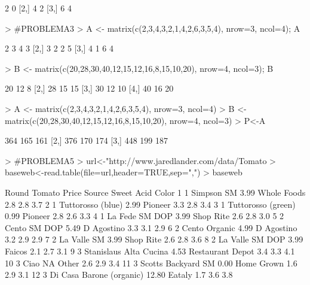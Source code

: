 \documentclass{article}
\begin{document}
\begin{Schunk}
\begin{Soutput}
     [,1] [,2]
[1,]    2    0
[2,]    4    2
[3,]    6    4
\end{Soutput}
\begin{Sinput}
> #PROBLEMA3
> A <- matrix(c(2,3,4,3,2,1,4,2,6,3,5,4), nrow=3, ncol=4); A
\end{Sinput}
\begin{Soutput}
     [,1] [,2] [,3] [,4]
[1,]    2    3    4    3
[2,]    3    2    2    5
[3,]    4    1    6    4
\end{Soutput}
\begin{Sinput}
> B <- matrix(c(20,28,30,40,12,15,12,16,8,15,10,20), nrow=4, ncol=3); B
\end{Sinput}
\begin{Soutput}
     [,1] [,2] [,3]
[1,]   20   12    8
[2,]   28   15   15
[3,]   30   12   10
[4,]   40   16   20
\end{Soutput}
\begin{Sinput}
> A <- matrix(c(2,3,4,3,2,1,4,2,6,3,5,4), nrow=3, ncol=4)
> B <- matrix(c(20,28,30,40,12,15,12,16,8,15,10,20), nrow=4, ncol=3)
>              P<-A %*%B;P
\end{Sinput}
\begin{Soutput}
     [,1] [,2] [,3]
[1,]  364  165  161
[2,]  376  170  174
[3,]  448  199  187
\end{Soutput}
\begin{Sinput}
> #PROBLEMA5
>              url<-"http://www.jaredlander.com/data/Tomato%20First.csv"
> baseweb<-read.table(file=url,header=TRUE,sep=",")
> baseweb
\end{Sinput}
\begin{Soutput}
   Round                   Tomato Price           Source Sweet Acid Color
1      1               Simpson SM  3.99      Whole Foods   2.8  2.8   3.7
2      1        Tuttorosso (blue)  2.99          Pioneer   3.3  2.8   3.4
3      1       Tuttorosso (green)  0.99          Pioneer   2.8  2.6   3.3
4      1           La Fede SM DOP  3.99        Shop Rite   2.6  2.8   3.0
5      2             Cento SM DOP  5.49       D Agostino   3.3  3.1   2.9
6      2            Cento Organic  4.99       D Agostino   3.2  2.9   2.9
7      2              La Valle SM  3.99        Shop Rite   2.6  2.8   3.6
8      2          La Valle SM DOP  3.99           Faicos   2.1  2.7   3.1
9      3   Stanislaus Alta Cucina  4.53 Restaurant Depot   3.4  3.3   4.1
10     3                     Ciao    NA            Other   2.6  2.9   3.4
11     3       Scotts Backyard SM  0.00       Home Grown   1.6  2.9   3.1
12     3 Di Casa Barone (organic) 12.80           Eataly   1.7  3.6   3.8

\end{Soutput}
\end{Schunk}
\end{document}
